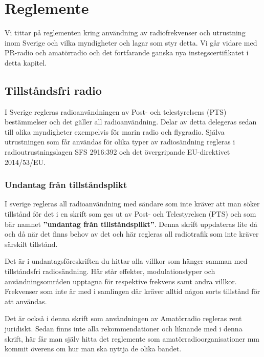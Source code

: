 \chapter{Reglemente}

Vi tittar på reglementen kring användning av radiofrekvenser och utrustning
inom Sverige och vilka myndigheter och lagar som styr detta. Vi går vidare med
PR-radio och amatörradio och det fortfarande ganska nya instegscertifikatet i
detta kapitel.

\vfill \minitoc

\clearpage

\section{Tillståndsfri radio}

I Sverige regleras radioanvändningen av Post- och telestyrelsens (PTS)
bestämmelser och det gäller all radioanvändning. Delar av detta delegeras
sedan till olika myndigheter exempelvis för marin radio och flygradio. Själva
utrustningen som får användas för olika typer av radiosändning regleras i
radioutrustningslagen SFS 2916:392 och det övergripande EU-direktivet
2014/53/EU.

\subsection{Undantag från tillståndsplikt}

I sverige regleras all radioanvändning med sändare som inte kräver att man
söker tillstånd för det i en skrift som ges ut av Post- och Telestyrelsen
(PTS) och som bär namnet {\bf ''undantag från tillståndsplikt''}. Denna skrift
uppdateras lite då och då när det finns behov av det och här regleras all
radiotrafik som inte kräver särskilt tillstånd.

Det är i undantagsföreskriften du hittar alla villkor som hänger samman med
tillståndsfri radio\-sänd\-ning. Här står effekter, modulationstyper och
användningsområden upptagna för respektive frekvens samt andra
villkor. Frekvenser som inte är med i samlingen där kräver alltid någon sorts
tillstånd för att användas.

Det är också i denna skrift som användningen av Amatörradio regleras rent
juridiskt. Sedan finns inte alla rekommendationer och liknande med i denna
skrift, här får man själv hitta det reglemente som amatörradioorganisationer
mm kommit överens om hur man ska nyttja de olika bandet.

